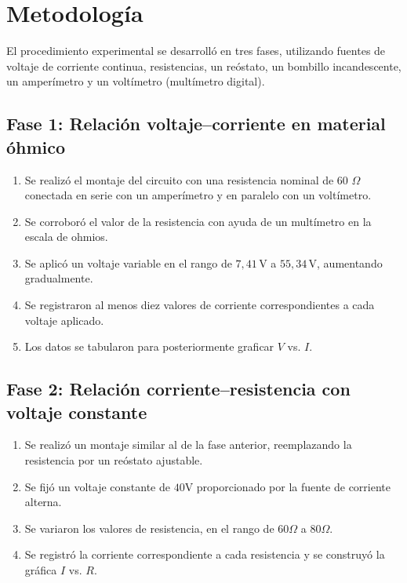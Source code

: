 \documentclass[11pt,twocolumn]{article}
\begin{document}
\section{Metodología}

El procedimiento experimental se desarrolló en tres fases, utilizando fuentes de voltaje de corriente continua, resistencias, un reóstato, un bombillo incandescente, un amperímetro y un voltímetro (multímetro digital). 

\subsection*{Fase 1: Relación voltaje--corriente en material óhmico}
\begin{enumerate}
    \item Se realizó el montaje del circuito con una resistencia nominal de 60 \(\Omega\) conectada en serie con un amperímetro y en paralelo con un voltímetro.
    \item Se corroboró el valor de la resistencia con ayuda de un multímetro en la escala de ohmios.
    \item Se aplicó un voltaje variable en el rango de $7,41 \, \text{V}$ a $55,34 \, \text{V}$, aumentando gradualmente.
    \item Se registraron al menos diez valores de corriente correspondientes a cada voltaje aplicado.
    \item Los datos se tabularon para posteriormente graficar $V$ vs. $I$.
\end{enumerate}

\subsection*{Fase 2: Relación corriente--resistencia con voltaje constante}
\begin{enumerate}
    \item Se realizó un montaje similar al de la fase anterior, reemplazando la resistencia por un reóstato ajustable.
    \item Se fijó un voltaje constante de $40 \text{V}$ proporcionado por la fuente de corriente alterna.
    \item Se variaron los valores de resistencia, en el rango de $60 \Omega$ a $80 \Omega$.
    \item Se registró la corriente correspondiente a cada resistencia y se construyó la gráfica $I$ vs. $R$.
\end{enumerate}
\end{document}
